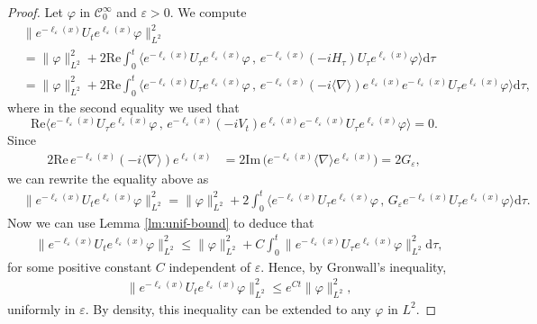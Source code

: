 \documentclass[10pt,a4paper]{amsart}
\newcommand{\Teps}{{G_\varepsilon}}
\begin{document}
	\begin{proof}
	    Let $\varphi$ in $\mathcal{C}^\infty_0$ and  $\varepsilon>0$.  We  compute
	    \begin{align*}
    &\big\|e^{-\ell_\varepsilon(x)}U_te^{\ell_\varepsilon(x)}\varphi\big\|_{L^2}^2\\
    &=\|\varphi\|_{L^2}^2+2\mathrm{Re}\int_0^t\big\langle e^{-\ell_\varepsilon(x)}U_\tau e^{\ell_\varepsilon(x)}\varphi \, , \, e^{-\ell_\varepsilon(x)} (-iH_\tau)U_\tau e^{\ell_\varepsilon(x)}\varphi\big\rangle\mathrm{d}\tau\\
    &=\|\varphi\|_{L^2}^2+2\mathrm{Re}\int_0^t\big\langle e^{-\ell_\varepsilon(x)}U_\tau e^{\ell_\varepsilon(x)}\varphi \, , \, e^{-\ell_\varepsilon(x)} (-i\langle\nabla\rangle)e^{\ell_\varepsilon(x)}e^{-\ell_\varepsilon(x)}U_\tau e^{\ell_\varepsilon(x)}\varphi\big\rangle\mathrm{d}\tau,
\end{align*}
where in the second equality we used that
\begin{equation*}
    \mathrm{Re}\big\langle e^{-\ell_\varepsilon(x)}U_\tau e^{\ell_\varepsilon(x)}\varphi \, , \, e^{-\ell_\varepsilon(x)} (-iV_t)e^{\ell_\varepsilon(x)}e^{-\ell_\varepsilon(x)}U_\tau e^{\ell_\varepsilon(x)}\varphi\big\rangle=0.
\end{equation*}
Since
\begin{align*}
    2\mathrm{Re}\, e^{-\ell_\varepsilon(x)} (-i\langle\nabla\rangle)e^{\ell_\varepsilon(x)}&=2\mathrm{Im}\,\big( e^{-\ell_\varepsilon(x)}\langle\nabla\rangle e^{\ell_\varepsilon(x)}\big)=2\Teps, 
\end{align*}
we can rewrite the equality above as
	\begin{align}\label{eq:Gronwall}
    &\big\|e^{-\ell_\varepsilon(x)}U_te^{\ell_\varepsilon(x)}\varphi\big\|_{L^2}^2=\|\varphi\|_{L^2}^2+2\int_0^t\big\langle e^{-\ell_\varepsilon(x)}U_\tau e^{\ell_\varepsilon(x)}\varphi \, , \, \Teps e^{-\ell_\varepsilon(x)}U_\tau e^{\ell_\varepsilon(x)}\varphi\big\rangle\mathrm{d}\tau.
\end{align}
Now we can use Lemma \ref{lm:unif-bound} to deduce that
\begin{align*}
    &\big\|e^{-\ell_\varepsilon(x)}U_te^{\ell_\varepsilon(x)}\varphi\big\|_{L^2}^2
    \le\|\varphi\|_{L^2}^2+C\int_0^t\big\| e^{-\ell_\varepsilon(x)}U_\tau e^{\ell_\varepsilon(x)}\varphi\big\|_{L^2}^2\mathrm{d}\tau,
\end{align*}
for some positive constant $C$ independent of $\varepsilon$. Hence, by Gronwall's inequality,
\begin{align}\label{eq:Gronwall-eps}
    &\big\|e^{-\ell_\varepsilon(x)}U_te^{\ell_\varepsilon(x)}\varphi\big\|_{L^2}^2
    \le e^{Ct}\|\varphi\|_{L^2}^2,
\end{align}
uniformly in $\varepsilon$. By density, this inequality can be extended to any $\varphi$ in $L^2$.


\end{proof}
\end{document}

